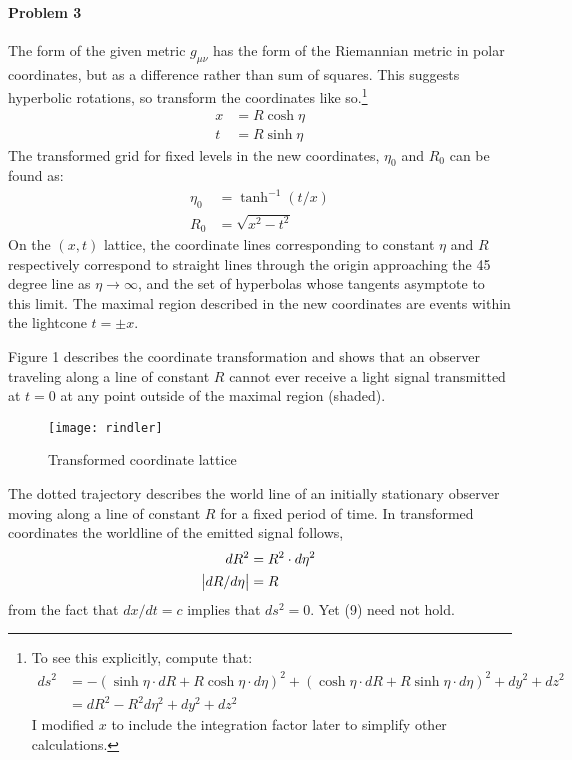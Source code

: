 \documentclass[10pt]{scrartcl}
\begin{document}
\paragraph{Problem 3}

The form of the given metric $g_{\mu\nu}$ has the form of the Riemannian metric  in polar coordinates, but as a difference rather than sum of squares. This suggests hyperbolic rotations, so transform the coordinates like so.\footnote{ To see this explicitly, compute that:
\begin{align*}
	ds^2 &= -(\sinh{\eta}\cdot dR + R\cosh{\eta}\cdot d\eta)^2 + (\cosh{\eta}\cdot dR + R\sinh{\eta}\cdot d\eta)^2 + dy^2 + dz^2 \\
	&= dR^2 - R^2 d\eta^2 + dy^2 + dz^2
\end{align*}
I modified $x$ to include the integration factor later to simplify other calculations.}
\begin{align}
	x&=R\cosh{\eta}\\
	t&=R\sinh{\eta}
\end{align}
The transformed grid for fixed levels in the new coordinates, $\eta_0$ and $R_0$ can be found as:
\begin{align}
	\eta_0 &= \tanh^{-1}{(t/x)}\\
	R_0 &= \sqrt{x^2 - t^2}
\end{align}
On the $(x, t)$ lattice, the coordinate lines corresponding to constant $\eta$ and $R$ respectively correspond to straight lines through the origin approaching the 45 degree line as $\eta\to\infty$, and the set of hyperbolas whose tangents asymptote to this limit. The maximal region described in the new coordinates are events within the lightcone $t=\pm x$. 

Figure 1 describes the coordinate transformation and shows that an observer traveling along a line of constant $R$ cannot ever receive a light signal transmitted at $t=0$ at any point outside of the maximal region (shaded).
\begin{figure}[h!]
\begin{center}
\texttt{[image: rindler]}
\end{center}
\caption{Transformed coordinate lattice}
\end{figure}
The dotted trajectory describes the world line of an initially stationary observer moving along a line of constant $R$ for a fixed period of time. In transformed coordinates the worldline of the emitted signal follows,
\begin{align}
dR^2 &= R^2\cdot d\eta^2 \\
\abs{dR / d\eta}&= R 	
\end{align}
from the fact that $dx/dt=c$ implies that $ds^2=0$. Yet (9) need not hold.
\end{document}

